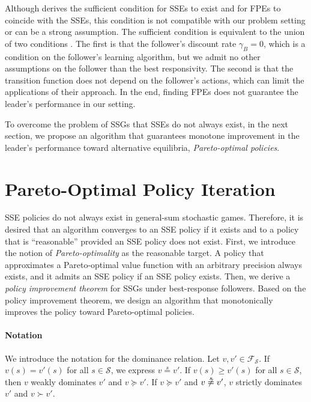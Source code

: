 \documentclass{acml}
\providecommand{\eqs}{\stackrel{s}{=}}
\begin{document}
Although \citet{Bucarey2022-ro} derives the sufficient condition for SSEs to exist and for FPEs to coincide with the SSEs, this condition is not compatible with our problem setting or can be a strong assumption.
The sufficient condition is equivalent to the union of two conditions \citep{Bucarey2022-ro}.
The first is that the follower's discount rate $\gamma_B=0$, which is a condition on the follower's learning algorithm, but we admit no other assumptions on the follower than the best responsivity.
The second is that the transition function does not depend on the follower's actions, which can limit the applications of their approach.
In the end, finding FPEs does not guarantee the leader's performance in our setting.

To overcome the problem of SSGs that SSEs do not always exist, in the next section, we propose an algorithm that guarantees monotone improvement in the leader's performance toward alternative equilibria, \emph{Pareto-optimal policies}.



\section{Pareto-Optimal Policy Iteration}\label{sec:proposition}

SSE policies do not always exist in general-sum stochastic games.
Therefore, it is desired that an algorithm converges to an SSE policy if it exists and to a policy that is ``reasonable'' provided an SSE policy does not exist. First, we introduce the notion of \emph{Pareto-optimality} as the reasonable target. A policy that approximates a Pareto-optimal value function with an arbitrary precision always exists, and it admits an SSE policy if an SSE policy exists. 
Then, we derive a \emph{policy improvement theorem} for SSGs under best-response followers. 
Based on the policy improvement theorem, we design an algorithm that monotonically improves the policy toward Pareto-optimal policies.



\paragraph{Notation}
We introduce the notation for the dominance relation. 
Let $v, v' \in \mathcal{F}_\mathcal{S}$. 
If $v(s) = v'(s)$ for all $s \in \mathcal{S}$, we express $v \eqs v'$.
If $v(s) \ge v'(s)$  for all $s \in \mathcal{S}$, then $v$ weakly dominates $v'$ and $v \succcurlyeq v'$. 
If $v \succcurlyeq v'$ and $v \not\eqs v'$, $v$ strictly dominates $v'$ and $v \succ v'$.
\end{document}
